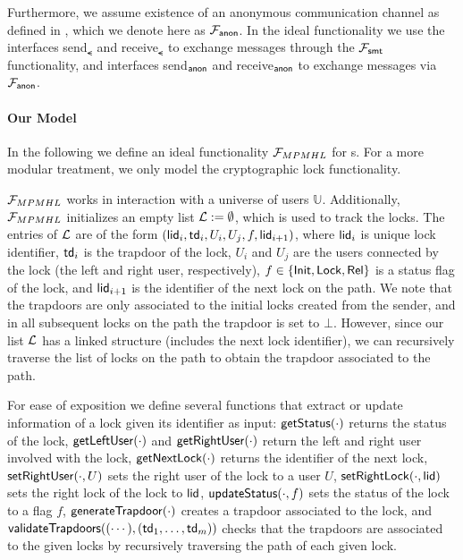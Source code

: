 Furthermore, we assume existence of an anonymous communication channel as defined in 
\cite{cl}, which we denote here as $\mathcal{F}_{\mathsf{anon}}$. In the ideal functionality we use the 
interfaces send$_\smt$ and receive$_\smt$ to exchange messages through the $\mathcal{F}_{\mathsf{smt}}$ 
functionality, and interfaces send$_{\mathsf{anon}}$ and receive$_{\mathsf{anon}}$ to exchange messages via 
$\mathcal{F}_{\mathsf{anon}}$.

\paragraph{Our Model}
In the following we define an ideal functionality $\mathcal{F}_{MPMHL}$ for {\sysname}s. For a 
more modular treatment, we only model the cryptographic lock functionality.


$\mathcal{F}_{MPMHL}$ works in interaction with a universe of users $\mathbb{U}$. Additionally, 
$\mathcal{F}_{MPMHL}$ initializes an empty list $\mathcal{L} := \emptyset$, which is used to track the 
locks. The entries of $\mathcal{L}$ are of the form $(\mathsf{lid}_i, \mathsf{td}_i, U_i, U_j, f, \\ \mathsf{lid}_{i+1})$, 
where $\mathsf{lid}_i$ is unique lock identifier, $\mathsf{td}_i$ is the trapdoor of the lock, $U_i$ and $U_j$ 
are the users connected by the lock (the left and right user, respectively), $f \in \{\mathsf{Init},\mathsf{Lock},
\mathsf{Rel}\}$ is a status flag of the lock, and $\mathsf{lid}_{i+1}$ is the identifier of the next lock on the 
path. We note that the trapdoors are only associated to the initial locks created from the sender, 
and in all subsequent locks on the path the trapdoor is set to $\bot$. However, since our list 
$\mathcal{L}$ has a linked structure (includes the next lock identifier), we can recursively traverse the 
list of locks on the path to obtain the trapdoor associated to the path.

For ease of exposition we define several functions that extract or update information of a 
lock given its identifier as input: $\mathsf{getStatus}(\cdot)$ returns the status of the lock, 
$\mathsf{getLeftUser}(\cdot)$ and $\mathsf{getRightUser}(\cdot)$ return the left and right user involved with the 
lock, $\mathsf{getNextLock}(\cdot)$ returns the identifier of the next lock, $\mathsf{setRightUser}(\cdot, U)$ 
sets the right user of the lock to a user $U$, $\mathsf{setRightLock}(\cdot, \mathsf{lid})$ sets the right lock 
of the lock to $\mathsf{lid}$, $\mathsf{updateStatus}(\cdot, f)$ sets the status of the lock to a flag $f$, 
$\mathsf{generateTrapdoor}(\cdot)$ creates a trapdoor associated to the lock, and $\mathsf{validateTrapdoors}
((\cdots), (\mathsf{td}_1,\ldots,\mathsf{td}_m))$ checks that the trapdoors are associated to the given locks 
by recursively traversing the path of each given lock.

